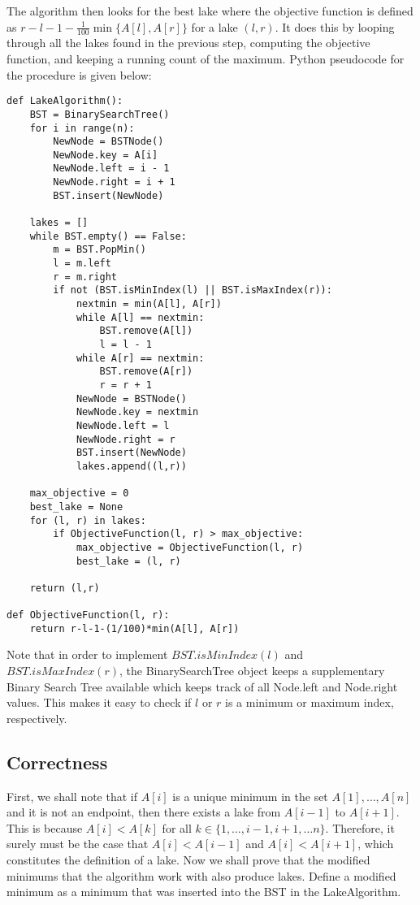 \documentclass{6046}
\begin{document}
The algorithm then looks for the best lake where the objective function is defined as $r - l - 1 - \frac{1}{100} \min \{A[l], A[r]\}$ for a lake $(l, r)$. It does this by looping through all the lakes found in the previous step, computing the objective function, and keeping a running count of the maximum. Python pseudocode for the procedure is given below:
\begin{verbatim}
def LakeAlgorithm():
    BST = BinarySearchTree()
    for i in range(n):
        NewNode = BSTNode()
        NewNode.key = A[i]
        NewNode.left = i - 1
        NewNode.right = i + 1
        BST.insert(NewNode)
    
    lakes = []
    while BST.empty() == False:
        m = BST.PopMin()
        l = m.left
        r = m.right
        if not (BST.isMinIndex(l) || BST.isMaxIndex(r)):
            nextmin = min(A[l], A[r])
            while A[l] == nextmin:
                BST.remove(A[l])
                l = l - 1
            while A[r] == nextmin:
                BST.remove(A[r])
                r = r + 1
            NewNode = BSTNode()
            NewNode.key = nextmin
            NewNode.left = l
            NewNode.right = r
            BST.insert(NewNode)
            lakes.append((l,r))

    max_objective = 0 
    best_lake = None
    for (l, r) in lakes:
        if ObjectiveFunction(l, r) > max_objective:
            max_objective = ObjectiveFunction(l, r)
            best_lake = (l, r)
    
    return (l,r)

def ObjectiveFunction(l, r):
    return r-l-1-(1/100)*min(A[l], A[r])
\end{verbatim}

Note that in order to implement $BST.isMinIndex(l)$ and $BST.isMaxIndex(r)$, the BinarySearchTree object keeps a supplementary Binary Search Tree available which keeps track of all Node.left and Node.right values. This makes it easy to check if $l$ or $r$ is a minimum or maximum index, respectively.   

\subsection*{Correctness}

First, we shall note that if $A[i]$ is a unique minimum in the set $A[1], \ldots, A[n]$ and it is not an endpoint, then there exists a lake from $A[i-1]$ to $A[i+1]$. This is because $A[i] < A[k]$ for all $k \in \{1, \ldots, i-1, i+1, \ldots n \}$. Therefore, it surely must be the case that $A[i] < A[i-1]$ and $A[i] < A[i+1]$, which constitutes the definition of a lake. Now we shall prove that the modified minimums that the algorithm work with also produce lakes. Define a modified minimum as a minimum that was inserted into the BST in the LakeAlgorithm. 
\end{document}
